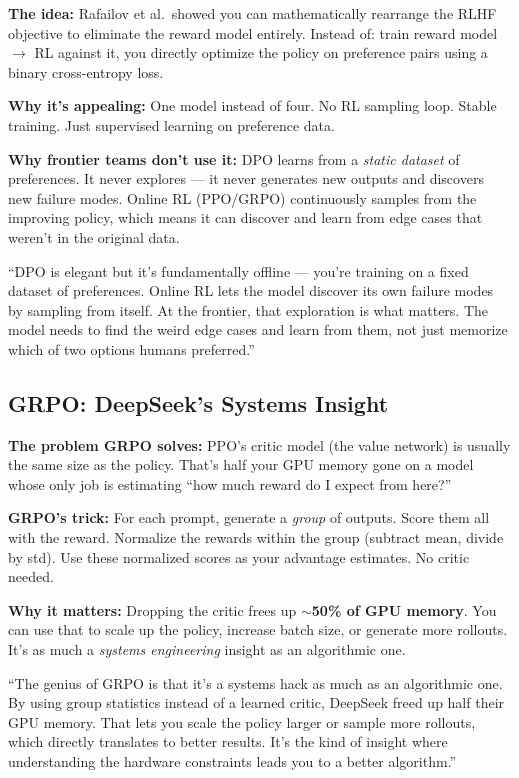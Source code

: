 \textbf{The idea:} Rafailov et al.\ showed you can mathematically rearrange the RLHF objective to eliminate the reward model entirely. Instead of: train reward model $\to$ RL against it, you directly optimize the policy on preference pairs using a binary cross-entropy loss.

\textbf{Why it's appealing:} One model instead of four. No RL sampling loop. Stable training. Just supervised learning on preference data.

\textbf{Why frontier teams don't use it:} DPO learns from a \textit{static dataset} of preferences. It never explores --- it never generates new outputs and discovers new failure modes. Online RL (PPO/GRPO) continuously samples from the improving policy, which means it can discover and learn from edge cases that weren't in the original data.

\begin{sayit}
``DPO is elegant but it's fundamentally offline --- you're training on a fixed dataset of preferences. Online RL lets the model discover its own failure modes by sampling from itself. At the frontier, that exploration is what matters. The model needs to find the weird edge cases and learn from them, not just memorize which of two options humans preferred.''
\end{sayit}

\subsection{GRPO: DeepSeek's Systems Insight}

\textbf{The problem GRPO solves:} PPO's critic model (the value network) is usually the same size as the policy. That's half your GPU memory gone on a model whose only job is estimating ``how much reward do I expect from here?''

\textbf{GRPO's trick:} For each prompt, generate a \textit{group} of outputs. Score them all with the reward. Normalize the rewards within the group (subtract mean, divide by std). Use these normalized scores as your advantage estimates. No critic needed.

\textbf{Why it matters:} Dropping the critic frees up \textbf{$\sim$50\% of GPU memory}. You can use that to scale up the policy, increase batch size, or generate more rollouts. It's as much a \textit{systems engineering} insight as an algorithmic one.

\begin{sayit}[GRPO]
``The genius of GRPO is that it's a systems hack as much as an algorithmic one. By using group statistics instead of a learned critic, DeepSeek freed up half their GPU memory. That lets you scale the policy larger or sample more rollouts, which directly translates to better results. It's the kind of insight where understanding the hardware constraints leads you to a better algorithm.''
\end{sayit}

